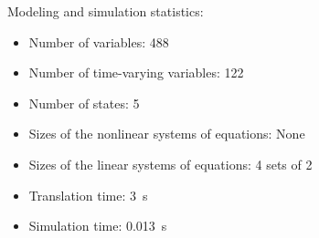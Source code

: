 \begin{contextbox}
  Modeling and simulation statistics:
  \begin{itemize}
    \item Number of variables: 488
    \item Number of time-varying variables: 122
    \item Number of states: 5
    \item Sizes of the nonlinear systems of equations: None
    \item Sizes of the linear systems of equations: 4 sets of 2
    \item Translation time: \SI{3}{s}
    \item Simulation time: \SI{0.013}{s}
  \end{itemize}
\end{contextbox}